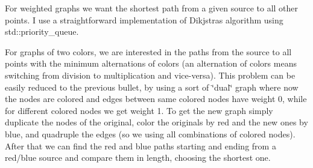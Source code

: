 \begin{DoxyItemize}
\item For weighted graphs we want the shortest path from a given source to all other points. I use a straightforward implementation of Dikjstra\textquotesingle{}s algorithm using std\+::priority\+\_\+queue.
\item For graphs of two colors, we are interested in the paths from the source to all points with the minimum alternations of colors (an alternation of colors means switching from division to multiplication and vice-\/versa). This problem can be easily reduced to the previous bullet, by using a sort of \char`\"{}dual\char`\"{} graph where now the nodes are colored and edges between same colored nodes have weight 0, while for different colored nodes we get weight 1. To get the new graph simply duplicate the nodes of the original, color the originals by red and the new ones by blue, and quadruple the edges (so we using all combinations of colored nodes). After that we can find the red and blue paths starting and ending from a red/blue source and compare them in length, choosing the shortest one. 
\end{DoxyItemize}